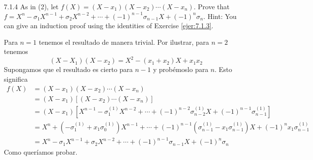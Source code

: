 \documentclass[twoside]{article}
\begin{document}
\begin{ejercicio}{7.1.4}
As in (2), let $f (X) = (X − x_1)(X − x_2) \cdots (X − x_n)$. Prove that $f = X^n − σ_1X^{n−1} +
σ_2X^{n−2} +\cdots+(−1)^{n−1}σ_{n−1}X +(−1)^nσ_n$. Hint: You can give an induction proof using
the identities of Exercise \ref{ejer:7.1.3}.
\end{ejercicio}
\begin{solucion}
Para $n=1$ tenemos el resultado de manera trivial. Por ilustrar, para $n=2$ tenemos
$$
(X-X_1)(X-x_2) = X^2-(x_1+x_2)X+x_1x_2
$$
Supongamos que el resultado es cierto para $n-1$ y probémoslo para $n$. Esto significa
\begin{align*}
f(X)&=(X − x_1)(X − x_2) \cdots (X − x_n)\\
&= (X-x_1)[(X − x_2) \cdots (X − x_n)]\\
&=(X-x_1)[X^{n-1} − σ_1^{(1)}X^{n−2} +\cdots+(−1)^{n−2}σ_{n−2}^{(1)}X +(−1)^{n-1}σ_{n-1}^{(1)}]\\
&=X^n + (-\sigma_1^{(1)} + x_1\sigma_0^{(1)})X^{n-1}+ \cdots +(-1)^{n-1}(\sigma_{n-1}^{(1)}-x_1\sigma_{n-1}^{(1)})X+(-1)^nx_1\sigma_{n-1}^{(1)}\\
&= X^n − σ_1X^{n−1} +σ_2X^{n−2} +\cdots+(−1)^{n−1}σ_{n−1}X +(−1)^nσ_n
\end{align*}
Como queríamos probar.
\end{solucion}

\newpage
\end{document}
